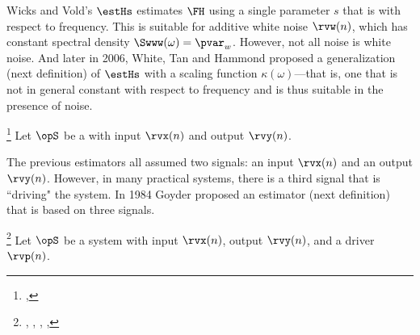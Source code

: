Wicks and Vold's $\estHs$ estimates $\FH$ using a single parameter $s$
that is  with respect to frequency.
This is suitable for additive white noise $\rvw(n)$, which has constant spectral density
$\Swww(\omega)=\pvar_w$.
However, not all noise is white noise.
And later in 2006, White, Tan and Hammond proposed a generalization (next definition) of $\estHs$ with a scaling
function $\kappa(\omega)$---that is, one that is not in general constant with respect to frequency
and is thus suitable in the presence of  noise.
\begin{definition}
\footnote{
  ,
  }
\label{def:Hkappa}
Let $\opS$ be a  with input $\rvx(n)$ and output $\rvy(n)$.
\end{definition}

The previous estimators all assumed two signals: an input $\rvx(n)$ and an output $\rvy(n)$.
However, in many practical systems, there is a third signal that is ``driving" the system.
In 1984 Goyder proposed an estimator (next definition) that is based on three signals.
\begin{definition}
\footnote{
  ,
  ,
  ,
  ,
  }
\label{def:Hc}
Let $\opS$ be a system with input $\rvx(n)$, output $\rvy(n)$, and a driver $\rvp(n)$.
\end{definition}

